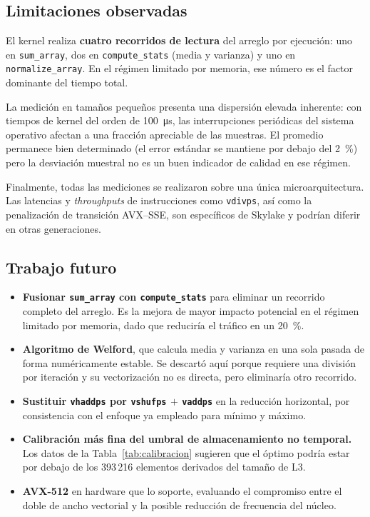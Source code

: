 \documentclass[journal]{IEEEtran}
\begin{document}
\subsection{Limitaciones observadas}

El kernel realiza \textbf{cuatro recorridos de lectura} del arreglo por
ejecución: uno en \texttt{sum\_array}, dos en \texttt{compute\_stats}
(media y varianza) y uno en \texttt{normalize\_array}. En el régimen
limitado por memoria, ese número es el factor dominante del tiempo total.

La medición en tamaños pequeños presenta una dispersión elevada
inherente: con tiempos de kernel del orden de \SI{100}{\micro\second}, las
interrupciones periódicas del sistema operativo afectan a una fracción
apreciable de las muestras. El promedio permanece bien determinado (el
error estándar se mantiene por debajo del \SI{2}{\percent}) pero la desviación
muestral no es un buen indicador de calidad en ese régimen.

Finalmente, todas las mediciones se realizaron sobre una única
microarquitectura. Las latencias y \textit{throughputs} de instrucciones
como \texttt{vdivps}, así como la penalización de transición
AVX--SSE, son específicos de Skylake y podrían diferir en otras
generaciones.

\subsection{Trabajo futuro}

\begin{itemize}
  \item \textbf{Fusionar \texttt{sum\_array} con \texttt{compute\_stats}}
        para eliminar un recorrido completo del arreglo. Es la mejora de
        mayor impacto potencial en el régimen limitado por memoria, dado
        que reduciría el tráfico en un \SI{20}{\percent}.
  \item \textbf{Algoritmo de Welford}, que calcula media y varianza en una
        sola pasada de forma numéricamente estable. Se descartó aquí
        porque requiere una división por iteración y su
        vectorización no es directa, pero eliminaría otro recorrido.
  \item \textbf{Sustituir \texttt{vhaddps} por \texttt{vshufps} $+$
        \texttt{vaddps}} en la reducción horizontal, por consistencia con
        el enfoque ya empleado para mínimo y máximo.
  \item \textbf{Calibración más fina del umbral de almacenamiento no
        temporal.} Los datos de la Tabla~\ref{tab:calibracion} sugieren que
        el óptimo podría estar por debajo de los 393\,216 elementos
        derivados del tamaño de L3.
  \item \textbf{AVX-512} en hardware que lo soporte, evaluando el
        compromiso entre el doble de ancho vectorial y la posible
        reducción de frecuencia del núcleo.
\end{itemize}
\printbibliography
 
\end{document}
